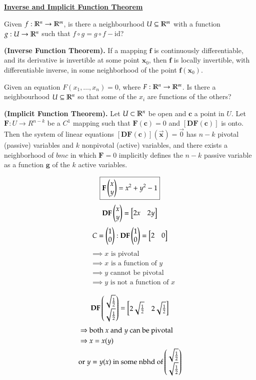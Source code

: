 
\ul{\textbf{Inverse and Implicit Function Theorem}}

Given $f : \mathbb{R}^n \to \mathbb{R}^m$, is there a neighbourhood $U\subseteq \mathbb{R}^m$ with a function $g : U \to \mathbb{R}^n$ such that $f\circ g = g\circ f - \mathrm{id}$?

\begin{theorem}
\textbf{(Inverse Function Theorem).} If a mapping $\bm{f}$ is continuously differentiable, and its derivative is invertible at some point $\bm{x}_0$, then $\bm{f}$ is locally invertible, with differentiable inverse, in some neighborhood of the point $\bm{f}(\bm{x}_0)$. 
\end{theorem}

Given an equation $F(x_1, \dots, x_n) = 0$, where $F : \mathbb{R}^n \to \mathbb{R}^m$. Is there a neighbourhood $U \subseteq \mathbb{R}^n$ so that some of the $x_i$ are functions of the others?

\begin{theorem}
  \textbf{(Implicit Function Theorem).} Let $U\subset \mathbb{R}^n$ be open and $\bm{c}$ a point in $U$. Let $\bm{F} : U \to R^{n-k}$ be a $C^1$ mapping such that $\bm{F}(\bm{c})=0$ and $[\bm{DF}(\bm{c})]$ is onto. Then the system of linear equations $[\bm{DF}(\bm{c})](\vec{\bm{x}})=\vec{0}$ has $n-k$ pivotal (passive) variables and $k$ nonpivotal (active) variables, and there exists a neighborhood of $bm{c}$ in which $\bm{F}=0$ implicitly defines the $n-k$ passive variable as a function $\bm{g}$ of the $k$ active variables.
\end{theorem}

\example
\[\boxed{\textbf{F}\begin{pmatrix} x \\ y \end{pmatrix} = x^2 + y^2 -1}\]
\[\textbf{DF}\begin{pmatrix} x \\ y \end{pmatrix} = \begin{bmatrix} 2x & 2y \end{bmatrix}\]
\[C = \begin{pmatrix} 1 \\ 0 \end{pmatrix} : \textbf{DF}\begin{pmatrix} 1 \\ 0 \end{pmatrix}=\begin{bmatrix} 2 & 0 \end{bmatrix}\]
\begin{align*}
  &\implies \text{$x$ is pivotal} \\
  &\implies \text{$x$ is a function of $y$} \\
  &\implies \text{$y$ cannot be pivotal} \\
  &\implies \text{$y$ is not a function of $x$}
\end{align*}

\[\textbf{DF}\begin{pmatrix} \sqrt{\frac{1}{2}} \\ \sqrt{\frac{1}{2}} \end{pmatrix}=\begin{bmatrix} 2\sqrt{\frac{1}{2}} & 2\sqrt{\frac{1}{2}} \end{bmatrix}\]
\begin{align*}
  &\Rightarrow \text{both $x$ and $y$ can be pivotal} \\
  &\Rightarrow x = x(y) \\
  &\text{or $y = y(x)$ in some nbhd of} \begin{pmatrix} \sqrt{\frac{1}{2}} \\ \sqrt{\frac{1}{2}} \end{pmatrix}
\end{align*}

